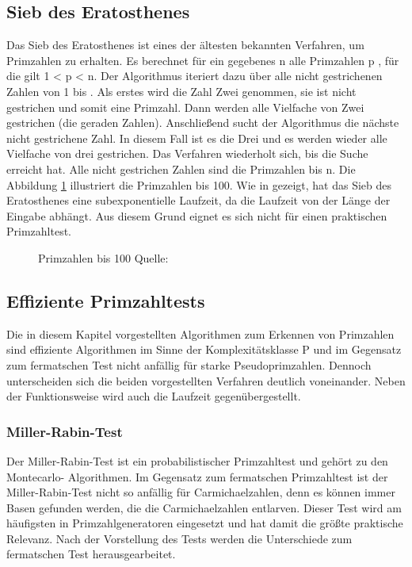 	\subsection{Sieb des Eratosthenes}
	Das Sieb des Eratosthenes ist eines der ältesten bekannten Verfahren, um Primzahlen zu erhalten. Es berechnet für ein gegebenes n \myin {} alle Primzahlen p \myin {}, für die gilt 1 < p < n. Der Algorithmus iteriert dazu über alle nicht gestrichenen Zahlen von 1 bis . Als erstes wird die Zahl Zwei genommen, sie ist nicht gestrichen und somit eine Primzahl. Dann werden alle Vielfache von Zwei gestrichen (die geraden Zahlen). Anschließend sucht der Algorithmus die nächste nicht gestrichene Zahl. In diesem Fall ist es die Drei und es werden wieder alle Vielfache von drei gestrichen. Das Verfahren wiederholt sich, bis die Suche  erreicht hat. Alle nicht gestrichen Zahlen sind die Primzahlen bis n. Die Abbildung \ref{ABBILDUNG_Primzahlen_100} illustriert die Primzahlen bis 100.
	Wie in \cite{Algebraische:und:zahlentheoretische:Grundlagen:fuer:die:Informatik} gezeigt, hat das Sieb des Eratosthenes eine subexponentielle Laufzeit, da die Laufzeit von der Länge der Eingabe abhängt. Aus diesem Grund eignet es sich nicht für einen praktischen Primzahltest.
	\begin{figure}
		\centering
		\caption{Primzahlen bis 100 Quelle: \cite{Mathe:Lexikon:SiebDesEratosthenes}}
		\label{ABBILDUNG_Primzahlen_100}
	\end{figure}
	
	\subsection{Effiziente Primzahltests} \label{Effiziente Primzahltests}
		Die in diesem Kapitel vorgestellten Algorithmen zum Erkennen von Primzahlen sind effiziente Algorithmen im Sinne der Komplexitätsklasse P und im Gegensatz zum fermatschen Test nicht anfällig für starke Pseudoprimzahlen. Dennoch unterscheiden sich die beiden vorgestellten Verfahren deutlich voneinander. Neben der Funktionsweise wird auch die Laufzeit gegenübergestellt.
		
		\subsubsection{Miller-Rabin-Test}
		 Der Miller-Rabin-Test ist ein probabilistischer Primzahltest und gehört zu den Montecarlo- Algorithmen. Im Gegensatz zum fermatschen Primzahltest ist der Miller-Rabin-Test nicht so anfällig für Carmichaelzahlen, denn es können immer Basen gefunden werden, die die Carmichaelzahlen entlarven. Dieser Test wird am häufigsten in Primzahlgeneratoren eingesetzt und hat damit die größte praktische Relevanz. Nach der Vorstellung des Tests werden die Unterschiede zum fermatschen Test herausgearbeitet.
		 
